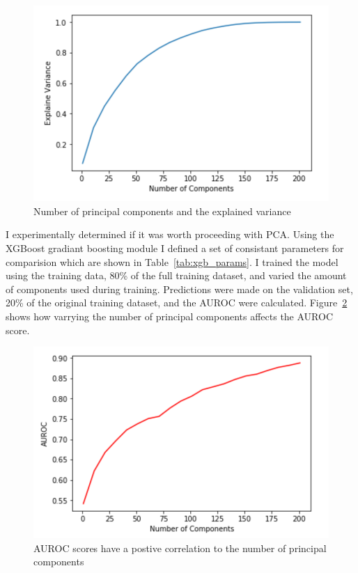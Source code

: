\documentclass[11pt,letterpaper]{article}
\begin{document}
\begin{figure}[h!]
    \centering
        \includegraphics[width=.5\textwidth]{pca_explain.png}
        \caption{Number of principal components and the explained variance}
        \label{fig:pca_explain}
\end{figure}

I experimentally determined if it was worth proceeding with PCA.  Using the
XGBoost gradiant boosting module I defined a set of consistant parameters for
comparision which are shown in Table~\ref{tab:xgb_params}.  I trained the model
using the training data, 80\% of the full training dataset, and varied the
amount of components used during training. Predictions were made on the
validation set, 20\% of the original training dataset, and the AUROC were
calculated.  Figure~\ref{fig:pca_auc} shows how varrying the
number of principal components affects the AUROC score. 

\begin{table}[h!]
\centering
\caption{XGBoost parameters}
\label{tab:xgb_params}
\end{table}

\begin{figure}[h!]
    \centering
        \includegraphics[width=.5\textwidth]{pca_auc.png}
        \caption{AUROC scores have a postive correlation to the number of
principal components}
        \label{fig:pca_auc}
\end{figure}
\end{document}
